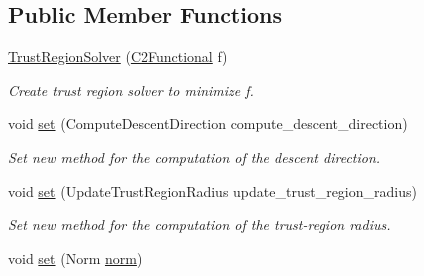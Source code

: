 \subsection*{Public Member Functions}
\begin{DoxyCompactItemize}
\item 
\hyperlink{classSpacy_1_1Algorithm_1_1TrustRegionSolver_a0e43b97119b6dc0a25fc9f242b084d16}{Trust\-Region\-Solver} (\hyperlink{classSpacy_1_1C2Functional}{C2\-Functional} f)
\begin{DoxyCompactList}\small\item\em Create trust region solver to minimize f. \end{DoxyCompactList}\item 
\hypertarget{classSpacy_1_1Algorithm_1_1TrustRegionSolver_aa36019ca1c80a230a1c45022d3cdfd9f}{void \hyperlink{classSpacy_1_1Algorithm_1_1TrustRegionSolver_aa36019ca1c80a230a1c45022d3cdfd9f}{set} (Compute\-Descent\-Direction compute\-\_\-descent\-\_\-direction)}\label{classSpacy_1_1Algorithm_1_1TrustRegionSolver_aa36019ca1c80a230a1c45022d3cdfd9f}

\begin{DoxyCompactList}\small\item\em Set new method for the computation of the descent direction. \end{DoxyCompactList}\item 
\hypertarget{classSpacy_1_1Algorithm_1_1TrustRegionSolver_a9f276e949d1dbfc6f40574be638e1fff}{void \hyperlink{classSpacy_1_1Algorithm_1_1TrustRegionSolver_a9f276e949d1dbfc6f40574be638e1fff}{set} (Update\-Trust\-Region\-Radius update\-\_\-trust\-\_\-region\-\_\-radius)}\label{classSpacy_1_1Algorithm_1_1TrustRegionSolver_a9f276e949d1dbfc6f40574be638e1fff}

\begin{DoxyCompactList}\small\item\em Set new method for the computation of the trust-\/region radius. \end{DoxyCompactList}\item 
\hypertarget{classSpacy_1_1Algorithm_1_1TrustRegionSolver_a680c40b650a60c9e9935e0c6b0e65888}{void \hyperlink{classSpacy_1_1Algorithm_1_1TrustRegionSolver_a680c40b650a60c9e9935e0c6b0e65888}{set} (Norm \hyperlink{namespaceSpacy_a86a4fc266aa19a07b0af16388907354b}{norm})}\label{classSpacy_1_1Algorithm_1_1TrustRegionSolver_a680c40b650a60c9e9935e0c6b0e65888}


\end{DoxyCompactItemize}
